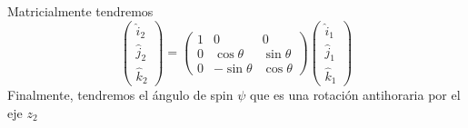 \documentclass[12pt]{article}
\begin{document}
Matricialmente tendremos
\begin{equation}
    \begin{pmatrix}
        \hat i_2 \\ \hat j_2 \\ \hat k_2
    \end{pmatrix} =
    \begin{pmatrix}
        1 & 0&0 \\
        0 & \cos\theta & \sin\theta \\
        0&-\sin\theta & \cos \theta
    \end{pmatrix}
    \begin{pmatrix}
        \hat i_1 \\ \hat j_1 \\ \hat k_1
    \end{pmatrix}
\end{equation}
Finalmente, tendremos el ángulo de spin $\psi$ que es una rotación antihoraria por el eje $z_2$
\end{document}
